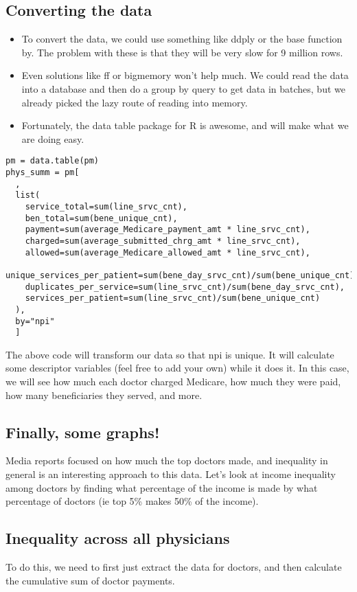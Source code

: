 \subsection*{Converting the data}
\begin{itemize}
\item To convert the data, we could use something like ddply or the base function by. The problem with these is that they will be very slow for 9 million rows. 
\item Even solutions like ff or bigmemory won't help much. We could read the data into a database and then do a group by query to get data in batches, but we already picked the lazy route of reading into memory.
\item 
Fortunately, the data table package for R is awesome, and will make what we are doing easy.
\end{itemize}
\begin{framed}
\begin{verbatim}
pm = data.table(pm)
phys_summ = pm[
  ,
  list(
    service_total=sum(line_srvc_cnt),
    ben_total=sum(bene_unique_cnt),
    payment=sum(average_Medicare_payment_amt * line_srvc_cnt),
    charged=sum(average_submitted_chrg_amt * line_srvc_cnt),
    allowed=sum(average_Medicare_allowed_amt * line_srvc_cnt),
    unique_services_per_patient=sum(bene_day_srvc_cnt)/sum(bene_unique_cnt),
    duplicates_per_service=sum(line_srvc_cnt)/sum(bene_day_srvc_cnt),
    services_per_patient=sum(line_srvc_cnt)/sum(bene_unique_cnt)
  ),
  by="npi"
  ]

\end{verbatim}
\end{framed}
The above code will transform our data so that npi is unique. It will calculate some descriptor variables (feel free to add your own) while it does it. In this case, we will see how much each doctor charged Medicare, how much they were paid, how many beneficiaries they served, and more.

\subsection{Finally, some graphs!}
Media reports focused on how much the top doctors made, and inequality in general is an interesting approach to this data. Let's look at income inequality among doctors by finding what percentage of the income is made by what percentage of doctors (ie top 5\% makes 50\% of the income).

\subsection*{Inequality across all physicians}
To do this, we need to first just extract the data for doctors, and then calculate the cumulative sum of doctor payments.

